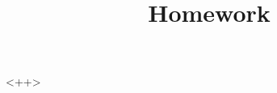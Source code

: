 \documentclass[12pt,reqno]{article}
\author{\theauthor}
\title{Homework \hwnumber}
\date{\thedate}
\theoremstyle{remark}
\begin{document}
<++>
\end{document}
